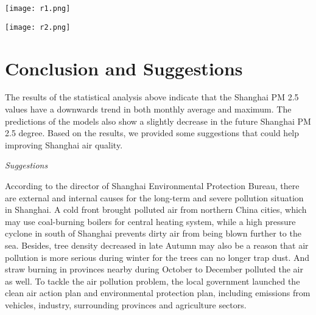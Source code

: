\documentclass[11pt,]{article}
\begin{document}
\begin{minipage}{.45\linewidth}
\begin{flushleft}

{\texttt{[image: r1.png]}}

\end{flushleft} 
\end{minipage}
\hfill
\begin{minipage}{.45\linewidth}
\begin{flushright} 

{\texttt{[image: r2.png]}}


\end{flushright} 
\end{minipage}


\vspace{3mm}

\section{Conclusion and Suggestions}

The results of the statistical analysis above indicate that the Shanghai PM 2.5 values have a downwards trend in both monthly average and maximum. The predictions of the models also show a slightly decrease in the future Shanghai PM 2.5 degree. Based on the results, we provided some suggestions that could help improving Shanghai air quality.
\vspace{3mm}

\noindent\emph{Suggestions}

\vspace{3mm}

According to the director of Shanghai Environmental Protection Bureau, there are external and internal causes for the long-term and severe pollution situation in Shanghai. A cold front brought polluted air from northern China cities, which may use coal-burning boilers for central heating system, while a high pressure cyclone in south of Shanghai prevents dirty air from being blown further to the sea. Besides, tree density decreased in late Autumn may also be a reason that air pollution is more serious during winter for the trees can no longer trap dust. And straw burning in provinces nearby during October to December polluted the air as well. To tackle the air pollution problem, the local government launched the clean air action plan and environmental protection plan, including emissions from vehicles, industry, surrounding provinces and agriculture sectors. 
\end{document}
